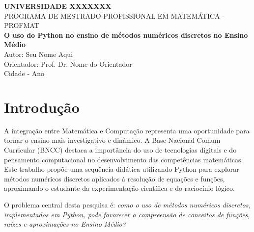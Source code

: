 \documentclass[12pt,a4paper]{report}
\begin{document}
	
	\begin{center}
		\Large{\textbf{UNIVERSIDADE XXXXXXX}} \\
		\large{PROGRAMA DE MESTRADO PROFISSIONAL EM MATEMÁTICA - PROFMAT} \\
		\vspace{3cm}
		\LARGE{\textbf{O uso do Python no ensino de métodos numéricos discretos no Ensino Médio}} \\
		\vspace{3cm}
		\large{Autor: Seu Nome Aqui} \\
		\large{Orientador: Prof. Dr. Nome do Orientador} \\
		\vfill
		\large{Cidade - Ano}
	\end{center}
	\newpage
	
	\begin{abstract}
		Este trabalho apresenta uma proposta de ensino de Matemática na Educação Básica utilizando a linguagem Python como ferramenta de apoio à exploração de métodos numéricos discretos. O projeto visa desenvolver o pensamento computacional e a compreensão de conceitos como aproximação, erro e convergência, por meio da resolução de equações e visualização gráfica de funções. A proposta está alinhada à BNCC, especialmente às habilidades EM13MAT401, EM13MAT402, EM13MAT501, EM13MAT502, EM13MAT503 e EM13MAT510, que incentivam o uso de tecnologias digitais, a análise de funções e a conversão entre representações algébricas e geométricas. \\ 
		\textbf{Palavras-chave:} Python; Métodos numéricos; Ensino Médio; BNCC; Equações; Aproximações.
	\end{abstract}
	\newpage
	
	\chapter{Introdução}
	
	A integração entre Matemática e Computação representa uma oportunidade para tornar o ensino mais investigativo e dinâmico. A Base Nacional Comum Curricular (BNCC) destaca a importância do uso de tecnologias digitais e do pensamento computacional no desenvolvimento das competências matemáticas. Este trabalho propõe uma sequência didática utilizando Python para explorar métodos numéricos discretos aplicados à resolução de equações e funções, aproximando o estudante da experimentação científica e do raciocínio lógico.
	
	O problema central desta pesquisa é: \textit{como o uso de métodos numéricos discretos, implementados em Python, pode favorecer a compreensão de conceitos de funções, raízes e aproximações no Ensino Médio?}
	
\end{document}
